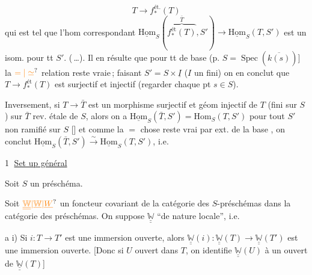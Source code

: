 \[
T\longrightarrow f_*^{\mathrm{ét.}}(T)
\]
qui est tel que l'hom correspondant $\underline{\mathrm{Hom}}_S(\overbrace{f_*^{\mathrm{ét}}(T)}^{\bar T},S')\longrightarrow\underline{\mathrm{Hom}}_S(T,S')$ est un isom. pour tt $S'$. (\,\dots). Il en résulte que pour tt   de base (p.    $S=\operatorname{Spec}(\overline{k(s)})$] la $\unsure{=|\simeq}$ relation reste vraie\,; faisant $S'=S\times\underline I$ ($I$ un fini) on en conclut que $T\to f_*^{\mathrm{ét}}(T)$ est surjectif et   injectif (regarder   chaque pt $s\in S$).

Inversement, si $T\to\bar T$ est un morphisme surjectif et géom injectif de $T$ (fini  sur $S$) sur $\bar T$ rev. étale de $S$, alors on a $\underline{\mathrm{Hom}}_S(\bar T,S')=\mathrm{Hom}_S(T,S')$ pour tout $S'$ non ramifié sur $S$ [] et comme la $=$ chose reste vrai par ext. de la base , on conclut  $\underline{\mathrm{Hom}}_S(\bar T,S')\xrightarrow{\sim}\underline{\mathrm{Hom}}_S(T,S')$, i.e. 

\textcircled{1}
\uline{Set up général}

Soit $S$ un préschéma. 

Soit $\unsure{\underline{\underline{\mathbb W}}|\underline{\mathbb W}|\underline W}$ un foncteur covariant de la catégorie des $S$-préschémas dans la catégorie des  préschémas. On suppose $\underline{\underline{\mathbb W}}$ ``de nature locale'', i.e.

a i) Si $i:T\longrightarrow T'$ est une immersion ouverte, alors $\underline{\underline{\mathbb W}}(i):\underline{\underline{\mathbb W}}(T)\to\underline{\underline{\mathbb W}}(T')$ est une immersion ouverte. [Donc si $U$ ouvert dans $T$, on identifie $\underline{\underline{\mathbb W}}(U)$ à un ouvert de $\underline{\underline{\mathbb W}}(T)$]


